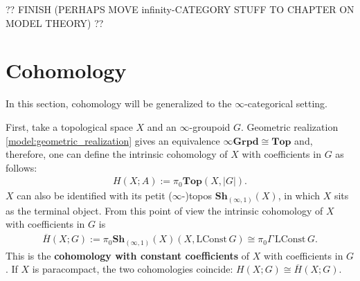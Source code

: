     ?? FINISH (PERHAPS MOVE infinity-CATEGORY STUFF TO CHAPTER ON MODEL THEORY) ??

\section{Cohomology}

    In this section, cohomology will be generalized to the $\infty$-categorical setting.

    First, take a topological space $X$ and an $\infty$-groupoid $G$. Geometric realization \ref{model:geometric_realization} gives an equivalence $\infty\mathbf{Grpd}\cong\mathbf{Top}$ and, therefore, one can define the intrinsic cohomology of $X$ with coefficients in $G$ as follows:
    \begin{gather}
        H(X;A) := \pi_0\mathbf{Top}(X,|G|).
    \end{gather}
    $X$ can also be identified with its petit ($\infty$-)topos $\mathbf{Sh}_{(\infty,1)}(X)$, in which $X$ sits as the terminal object. From this point of view the intrinsic cohomology of $X$ with coefficients in $G$ is
    \begin{gather}
        \overline{H}(X;G) := \pi_0\mathbf{Sh}_{(\infty,1)}(X)(X,\mathrm{LConst}\,G)\cong\pi_0\Gamma\,\mathrm{LConst}\,G.
    \end{gather}
    This is the \textbf{cohomology with constant coefficients} of $X$ with coefficients in $G$. If $X$ is paracompact, the two cohomologies coincide: $H(X;G)\cong\overline{H}(X;G)$.

